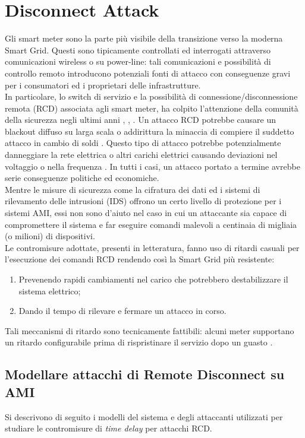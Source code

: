 \section{Disconnect Attack}
Gli smart meter sono la parte più visibile della transizione verso la moderna Smart Grid. Questi sono tipicamente controllati ed interrogati attraverso comunicazioni wireless o su power-line: tali comunicazioni e possibilità di controllo remoto introducono potenziali fonti di attacco con conseguenze gravi per i consumatori ed i proprietari delle infrastrutture.\\
In particolare, lo switch di servizio e la possibilità di connessione/disconnessione remota (RCD) associata agli smart meter, ha colpito l'attenzione della comunità della sicurezza negli ultimi anni \cite{offswitch}, \cite{remotecontrol}, \cite{amithreats}. Un attacco RCD potrebbe causare un blackout diffuso su larga scala o addirittura la minaccia di compiere il suddetto attacco in cambio di soldi \cite{offswitch}. Questo tipo di attacco potrebbe potenzialmente danneggiare la rete elettrica o altri carichi elettrici causando deviazioni nel voltaggio o nella frequenza \cite{remotecontrol}. In tutti i casi, un attacco portato a termine avrebbe serie conseguenze politiche ed economiche.\\
Mentre le misure di sicurezza come la cifratura dei dati ed i sistemi di rilevamento delle intrusioni (IDS) offrono un certo livello di protezione per i sistemi AMI, essi non sono d'aiuto nel caso in cui un attaccante sia capace di compromettere il sistema e far eseguire comandi malevoli a centinaia di migliaia (o milioni) di dispositivi.\\
Le contromisure adottate, presenti in letteratura, fanno uso di ritardi casuali per l'esecuzione dei comandi RCD rendendo così la Smart Grid più resistente:\\
\begin{enumerate}
	\item Prevenendo rapidi cambiamenti nel carico che potrebbero destabilizzare il sistema elettrico;
	\item Dando il tempo di rilevare e fermare un attacco in corso.
\end{enumerate}
Tali meccanismi di ritardo sono tecnicamente fattibili: alcuni meter supportano un ritardo configurabile prima di rispristinare il servizio dopo un guasto \cite{disconnectfaqs}.
\subsection{Modellare attacchi di Remote Disconnect su AMI}
Si descrivono di seguito i modelli del sistema e degli attaccanti utilizzati per studiare le contromisure di \emph{time delay} per attacchi RCD.
